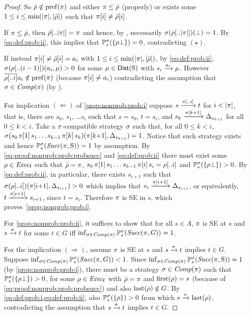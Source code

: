 \begin{proof}
  So $\bar{\rho}\notin\mathrm{pref}(\pi)$ and either $\pi\leq\bar{\rho}$
  (properly) or exists some $1\leq i \leq\min({|}{\pi}{|},{|}{\bar{\rho}}{|})$
  such that $\pi[i]\neq\bar{\rho}[i]$.

  If $\pi\leq\bar{\rho}$, then $\bar{\rho}[..{|}{\pi}{|}]=\pi$ and
  hence, by , necessarily
  $\sigma(\rho[..{|}{\pi}{|}])(\bot) = 1$.  By \cref{eq:def:prob:ii},
  this implies that $\mathbb{P}^\sigma_s(\{\rho\bot\})=0$,
  contradicting $(\star)$.

  If instead $\pi[i]\neq\bar{\rho}[i]=a_i$ with
  $1\leq i \leq\min({|}{\pi}{|},{|}{\bar{\rho}}{|})$, by \cref{eq:def:prob:ii},
  $\sigma(\rho[..(i-1)])(a_i,\mu) > 0$ for some
  $\mu\in\mathsf{Dist}(\operatorname{S})$ with $s_i\xrightarrow{a_i}\mu$.
  However $\overline{\rho[..i]}a_i \notin \mathrm{pref}(\pi)$
  (because $\pi[i]\neq a_i$) contradicting the assumption that
  $\sigma\in\mathit{Comp}(\pi)$ (by ).


  For implication $(\Leftarrow)$ of \cref{prop:nonprob:prob:i} suppose
  $s\xrightarrow{\pi[..i]}t$ for $i<{|}{\pi}{|}$, that is, there are $s_0$,
  $s_1$, \ldots $s_i$ such that $s=s_0$, $t=s_i$, and
  $s_k\xrightarrow{\pi[k{+}1]}\Delta_{s_{k{+}1}}$ for all $0\leq k < i$.
  Take a $\pi$-compatible strategy $\sigma$ such that, for all
  $0\leq k < i$,
  $\sigma(s_0\,\pi[1]\,s_1\ldots s_{k{-}1}\,\pi[k]\,s_k)(\pi[k{+}1],\Delta_{s_{k{+}1}})=1$.
  Notice that such strategy exists and hence
  $\mathbb{P}^\sigma_s(\mathit{Succ}(\pi,\operatorname{S}))=1$ by assumption.
  By \cref{eq:proof:nonprob:prob:probsucc} and \cref{eq:def:prob:ii}
  there must exist some $\rho\in\mathit{Exec}_{\mathsf{f}}$ such that $\bar{\rho}=\pi$,
  $s_0\,\pi[1]\,s_1\ldots s_{k{-}1}\,\pi[i]\,s_i = \rho[..i]$ and
  $\mathbb{P}^\sigma_s(\{\rho\bot\})>0$.  By \cref{eq:def:prob:ii}, in
  particular, there exists $s_{i{+}1}$ such that
  $\sigma(\rho[..i])(\pi[i{+}1],\Delta_{s_{i{+}1}})> 0$ which
  implies that $s_i\xrightarrow{\pi[i{+}1]}\Delta_{s_{i{+}1}}$, or
  equivalently, $t\xrightarrow{\pi[i{+}1]}s_{i{+}1}$, since $t=s_i$.
  Therefore $\pi$ is SE in $s$, which proves~\cref{prop:nonprob:prob:i}.

  For \cref{prop:nonprob:prob:ii}, it suffices to show that for all
  $s\in A$, $\pi$ is SE at $s$ and $s \xrightarrow{\pi} t$ for some
  $t\in G$ iff
  $\inf_{\sigma\in\mathit{Comp}(\pi)}\mathbb{P}^\sigma_s(\mathit{Succ}(\pi,G))=1$.

  For the implication $(\Rightarrow)$, assume $\pi$ is SE at $s$ and
  $s \xrightarrow{\pi} t$ implies $t\in G$.
  Suppose
  $\inf_{\sigma\in\mathit{Comp}(\pi)}\mathbb{P}^\sigma_s(\mathit{Succ}(\pi,G))<1$.
  Since
  $\inf_{\sigma\in\mathit{Comp}(\pi)}\mathbb{P}^\sigma_s(\mathit{Succ}(\pi,\operatorname{S}))=1$ (by
  \cref{prop:nonprob:prob:i}), there must be a strategy
  $\sigma\in\mathit{Comp}(\pi)$ such that
  $\mathbb{P}^\sigma_s(\{\rho\bot\})>0$, for some $\rho\in\mathit{Exec}_{\mathsf{f}}$ with
  $\bar{\rho}=\pi$ and $\mathrm{first}(\rho)=s$ (because of
  \cref{eq:proof:nonprob:prob:probsucc}) and also $\mathrm{last}(\rho)\notin G$.
  By \cref{eq:def:prob:i,eq:def:prob:ii}, also
  $\mathbb{P}^\sigma_s(\{\rho\})>0$ from which $s\xrightarrow{\pi}\mathrm{last}(\rho)$,
  contradicting the assumption that $s \xrightarrow{\pi} t$ implies
  $t\in G$.


\end{proof}
